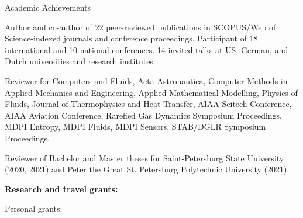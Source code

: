 \documentclass{resume} %
\begin{document}
\begin{rSection}{Academic Achievements}

Author and co-author of 22 peer-reviewed publications in SCOPUS/Web of Science-indexed  journals and conference proceedings.
Participant of 18 international and 10 national conferences. 14 invited talks at US, German, and Dutch universities and research institutes.


Reviewer for Computers and Fluids, Acta Astronautica, Computer Methods in Applied Mechanics and Engineering, Applied Mathematical Modelling, Physics of Fluids, Journal of Thermophysics and Heat Transfer, AIAA Scitech Conference, AIAA Aviation Conference, Rarefied Gas Dynamics Symposium Proceedings,  MDPI Entropy, MDPI Fluids, MDPI Sensors, STAB/DGLR Symposium Proceedings.

Reviewer of Bachelor and Master theses for Saint-Petersburg State University (2020, 2021) and Peter the Great St. Petersburg Polytechnic University (2021).

{\bf Research and travel grants:}


Personal grants:
\begin{enumerate}


\end{enumerate}
\end{rSection}
\end{document}
